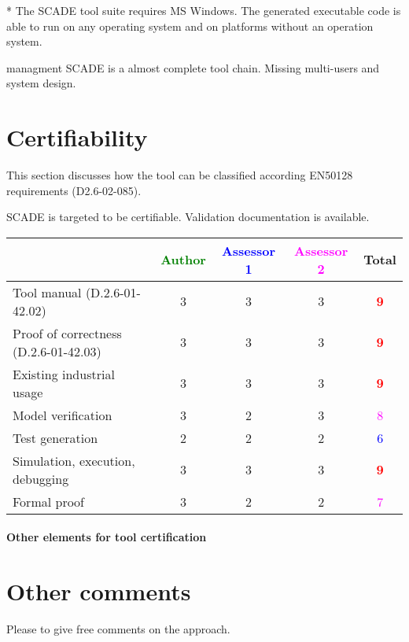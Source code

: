 \begin{author_comment}
* The SCADE tool suite requires MS Windows. The generated executable code is able to run on any operating system and on platforms without an operation system.   
\end{author_comment}

\begin{assessor2}managment
SCADE is a almost complete tool chain. Missing multi-users and system design.
\end{assessor2}
\section{Certifiability}

This section discusses how the tool can be classified according EN50128 requirements (D2.6-02-085).

\begin{author_comment}
SCADE is targeted to be certifiable. Validation documentation is available.   
\end{author_comment}


\begin{tabular}{|l | c | c | c | c|}
\hline
& \textcolor{green}{Author} & \textcolor{blue}{Assessor 1} & \textcolor{magenta}{Assessor 2} & Total \\
\hline 
Tool manual (D.2.6-01-42.02) & 3    & 3    &3 & \textcolor{red}{\textbf{9}} \\
\hline
Proof of correctness (D.2.6-01-42.03)   & 3    & 3    &3 & \textcolor{red}{\textbf{9}} \\
\hline
Existing industrial  usage  & 3    & 3    &3 & \textcolor{red}{\textbf{9}} \\
\hline
Model verification & 3    & 2    &3 & \textcolor{magenta}{8} \\
\hline
Test generation & 2    & 2    &2 & \textcolor{blue}{6} \\
\hline
Simulation, execution, debugging & 3    & 3    &3 & \textcolor{red}{\textbf{9}} \\
\hline
Formal proof & 3    & 2    &2 & \textcolor{magenta}{7} \\
\hline
\end{tabular}

\paragraph{Other elements for tool certification}

\section{Other comments}
Please to  give free comments on the approach.




